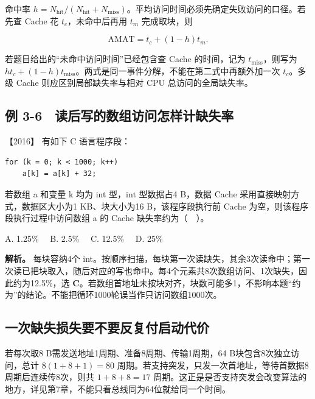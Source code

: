 命中率 \(h=N_{\mathrm{hit}}/(N_{\mathrm{hit}}+N_{\mathrm{miss}})\)。平均访问时间必须先确定失败访问的口径。若先查 Cache 花 \(t_c\)，未命中后再用 \(t_m\) 完成取块，则

\[
\mathrm{AMAT}=t_c+(1-h)t_m.
\]

若题目给出的``未命中访问时间''已经包含查 Cache 的时间，记为 \(t_{\mathrm{miss}}\)，则写为 \(ht_c+(1-h)t_{\mathrm{miss}}\)。两式是同一事件分解，不能在第二式中再额外加一次 \(t_c\)。多级 Cache 则应区别局部缺失率与相对 CPU 总访问的全局缺失率。

\subsection{例 3-6　读后写的数组访问怎样计缺失率}\label{co-ex3-6}

\noindent{}【2016】 有如下 C 语言程序段：

\par\medskip\noindent
\begin{minipage}{\linewidth}
\begin{verbatim}
for (k = 0; k < 1000; k++)
    a[k] = a[k] + 32;
\end{verbatim}
\end{minipage}\par\medskip

若数组 a 和变量 k 均为 int 型，int 型数据占4 B，数据 Cache 采用直接映射方式，数据区大小为1 KB、块大小为16 B，该程序段执行前 Cache 为空，则该程序段执行过程中访问数组 a 的 Cache 缺失率约为（　）。

A. 1.25\%　 B. 2.5\%　 C. 12.5\%　 D. 25\%


\textbf{解析。} 每块容纳4个 int。按顺序扫描，每块第一次读缺失，其余3次读命中；第一次读已把块取入，随后对应的写也命中。每4个元素共8次数组访问、1次缺失，因此约为12.5\%，选 \textbf{C}。若数组首地址未按块对齐，块数可能多1，不影响本题``约为''的结论。不能把循环1000轮误当作只访问数组1000次。

\subsection{一次缺失损失要不要反复付启动代价}\label{co-c03-h139}

若每次取8 B需发送地址1周期、准备8周期、传输1周期，64 B块包含8次独立访问，总计 \(8(1+8+1)=80\) 周期。若支持突发，只发一次首地址，等待首数据8周期后连续传8次，则共 \(1+8+8=17\) 周期。这正是是否支持突发会改变算法的地方，详见第7章，不能只看总线同为64位就给同一个时间。

